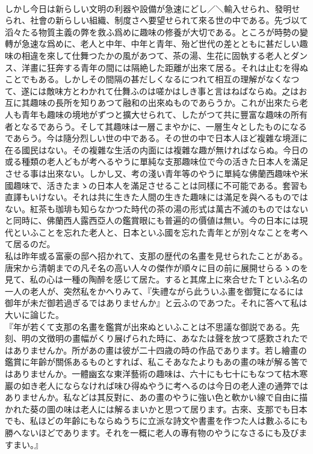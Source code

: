 \documentclass[8pt]{extreport}
\begin{document}
\begin{CJK}{UTF8}{min}
\\	しかし今日は新らしい文明の利器や設備が急速にどし／＼輸入せられ、發明せられ、社會の新らしい組織、制度さへ要望せられて來る世の中である。先づ以て滔々たる物質主義の弊を救ふ爲めに趣味の修養が大切である。ところが時勢の變轉が急速な爲めに、老人と中年、中年と青年、殆ど世代の差とともに甚だしい趣味の相違を來して仕舞つたかの風があつて、茶の湯、生花に固執する老人とダンス、洋畫に狂奔する青年の間には隔絶した距離が出來て居る。それは止むを得ぬことでもある。しかしその間隔の甚だしくなるにつれて相互の理解がなくなつて、遂には敵味方とわかれて仕舞ふのは嗟かはしき事と言はねばならぬ。之はお互に其趣味の長所を知りあつて融和の出來ぬものであらうか。これが出來たら老人も青年も趣味の境地がずつと擴大せられて、したがつて共に豐富な趣味の所有者となるであらう。そして其趣味は一層こまやかに、一層生々としたものになるであらう。今は隨分烈しい世の中である。その世の中で日本人ほど複雜な境涯に在る國民はない。その複雜な生活の内面には複雜な趣が無ければならぬ。今日の或る種類の老人どもが考へるやうに單純な支那趣味位で今の活きた日本人を滿足させる事は出來ない。しかし又、考の淺い青年等のやうに單純な佛蘭西趣味や米國趣味で、活きたまゝの日本人を滿足させることは同樣に不可能である。套習も直譯もいけない。それは共に生きた人間の生きた趣味には滿足を與へるものではない。紅茶も珈琲も知らなかつた時代の茶の湯の形式は萬古不滅のものではないと同時に、佛蘭西人露西亞人の鑑賞眼にも普遍的の價値は無い。今の日本には現代といふことを忘れた老人と、日本といふ國を忘れた青年とが別々なことを考へて居るのだ。
\\	私は昨年或る富豪の邸へ招かれて、支那の歴代の名畫を見せられたことがある。唐宋から清朝までの凡そ名の高い人々の傑作が順々に目の前に展開せらるゝのを見て、私の心は一種の陶醉を感じて居た。すると其席上に來合せたＴといふ名の一人の老人が、突然私をかへりみて、『失禮ながら此ういふ畫を御覽になるには御年が未だ御若過ぎるではありませんか』と云ふのであつた。それに答へて私は大いに論じた。
\\	『年が若くて支那の名畫を鑑賞が出來ぬといふことは不思議な御説である。先刻、明の文徴明の畫幅がくり展げられた時に、あなたは聲を放つて感歎されたではありませんか。所があの畫は彼が二十四歳の時の作品であります。若し繪畫の鑑賞に年齡が關係あるものとすれば、私こそあなたよりもあの畫の味が解る筈ではありませんか。一體幽玄な東洋藝術の趣味は、六十にも七十にもなつて枯木寒巖の如き老人にならなければ味ひ得ぬやうに考へるのは今日の老人達の通弊ではありませんか。私などは其反對に、あの畫のやうに強い色と軟かい線で自由に描かれた葵の圖の味は老人には解るまいかと思つて居ります。古來、支那でも日本でも、私ほどの年齡にもならぬうちに立派な詩文や書畫を作つた人は數ふるにも勝へないほどであります。それを一概に老人の專有物のやうになさるにも及びますまい。』

\end{CJK}
\end{document}
